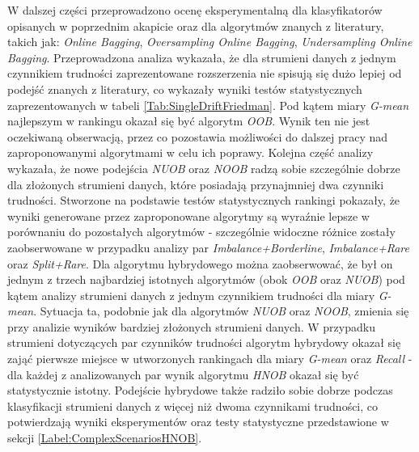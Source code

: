 W dalszej części przeprowadzono ocenę eksperymentalną dla klasyfikatorów opisanych w poprzednim akapicie oraz dla algorytmów znanych z literatury, takich jak: \textit{Online Bagging}, \textit{Oversampling Online Bagging}, \textit{Undersampling Online Bagging}. Przeprowadzona analiza wykazała, że dla strumieni danych z jednym czynnikiem trudności zaprezentowane rozszerzenia nie spisują się dużo lepiej od podejść znanych z literatury, co wykazały wyniki testów statystycznych zaprezentowanych w tabeli \ref{Tab:SingleDriftFriedman}. Pod kątem miary \textit{G-mean} najlepszym w rankingu okazał się być algorytm \textit{OOB}. Wynik ten nie jest oczekiwaną obserwacją, przez co pozostawia możliwości do dalszej pracy nad zaproponowanymi algorytmami w celu ich poprawy. Kolejna część analizy wykazała, że nowe podejścia \textit{NUOB} oraz \textit{NOOB} radzą sobie szczególnie dobrze dla złożonych strumieni danych, które posiadają przynajmniej dwa czynniki trudności. Stworzone na podstawie testów statystycznych rankingi pokazały, że wyniki generowane przez zaproponowane algorytmy są wyraźnie lepsze w porównaniu do pozostałych algorytmów - szczególnie widoczne różnice zostały zaobserwowane w przypadku analizy par \textit{Imbalance+Borderline}, \textit{Imbalance+Rare} oraz \textit{Split+Rare}. Dla algorytmu hybrydowego można zaobserwować, że był on jednym z trzech najbardziej istotnych algorytmów (obok \textit{OOB} oraz \textit{NUOB}) pod kątem analizy strumieni danych z jednym czynnikiem trudności dla miary \textit{G-mean}. Sytuacja ta, podobnie jak dla algorytmów \textit{NUOB} oraz \textit{NOOB}, zmienia się przy analizie wyników bardziej złożonych strumieni danych. W przypadku strumieni dotyczących par czynników trudności algorytm hybrydowy okazał się zająć pierwsze miejsce w utworzonych rankingach dla miary \textit{G-mean} oraz \textit{Recall} - dla każdej z analizowanych par wynik algorytmu \textit{HNOB} okazał się być statystycznie istotny. Podejście hybrydowe także radziło sobie dobrze podczas klasyfikacji strumieni danych z więcej niż dwoma czynnikami trudności, co potwierdzają wyniki eksperymentów oraz testy statystyczne przedstawione w sekcji \ref{Label:ComplexScenariosHNOB}.


